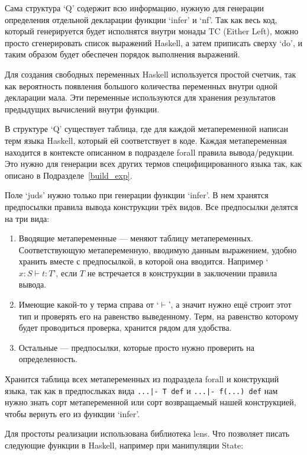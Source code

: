 Сама структура `Q' содержит всю информацию, нужную для генерации определения отдельной декларации функции `infer' и `nf'. Так как весь код, который генерируется будет исполнятся внутри монады TC (Either Left), можно просто сгенерировать список выражений Haskell, а затем приписать сверху `do', и таким образом будет обеспечен порядок выполнения выражений.

Для создания свободных переменных Haskell используется простой счетчик, так как вероятность появления большого количества переменных внутри одной декларации мала. Эти переменные используются для хранения результатов предыдущих вычислений внутри функции.

В структуре `Q' существует таблица, где для каждой метапеременной написан терм языка Haskell, который ей соответствует в коде. Каждая метапеременная находится в контексте описанном в подразделе forall правила вывода/редукции. Это нужно для генерации всех других термов специфицированного языка так, как описано в Подразделе~\ref{build_exp}.

Поле `juds' нужно только при генерации функции `infer'. В нем хранятся предпосылки правила вывода конструкции трёх видов. Все предпосылки делятся на три вида:
\begin{enumerate}
  \item Вводящие метапеременные --- меняют таблицу метапеременных. Соответствующую метапеременную, вводимую данным выражением, удобно хранить вместе с предпосылкой, в которой она вводится. Например `$x : S \vdash t : T$', если $T$ не встречается в конструкции в заключении правила вывода.
  \item Имеющие какой-то у терма справа от `$\vdash$', а значит нужно ещё строит этот тип и проверять его на равенство выведенному. Терм, на равенство которому будет проводиться проверка, хранится рядом для удобства.
  \item Остальные --- предпосылки, которые просто нужно проверить на определенность.
\end{enumerate}

Хранится таблица всех метапеременных из подраздела forall и конструкций языка, так как в предпослыках вида \lstinline{...|- T def} и \lstinline{...|- f(...) def} нам нужно знать сорт метапеременной или сорт возвращаемый нашей конструкцией, чтобы вернуть его из функции `infer'.

Для простоты реализации использована библиотека lens\cite{lens}. Что позволяет писать следующие функции в Haskell, например при манипуляции State:

